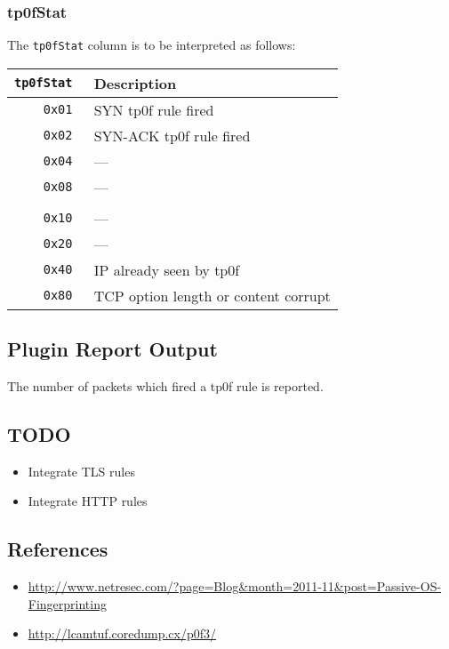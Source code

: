 \documentclass[documentation]{subfiles}
\begin{document}
\subsubsection{tp0fStat}\label{tp0fStat}
The {\tt tp0fStat} column is to be interpreted as follows:
\begin{longtable}{>{\tt}rl}
    \toprule
    {\bf tp0fStat} & {\bf Description}\\
    \midrule\endhead%
    0x01 & SYN tp0f rule fired\\
    0x02 & SYN-ACK tp0f rule fired\\
    0x04 & ---\\
    0x08 & ---\\
    \\
    0x10 & ---\\
    0x20 & ---\\
    0x40 & IP already seen by tp0f\\
    0x80 & TCP option length or content corrupt \\
    \bottomrule
\end{longtable}

\subsection{Plugin Report Output}
The number of packets which fired a tp0f rule is reported.



\subsection{TODO}
\begin{itemize}
    \item Integrate TLS rules
    \item Integrate HTTP rules
\end{itemize}

\subsection{References}
\begin{itemize}
    \item \url{http://www.netresec.com/?page=Blog&month=2011-11&post=Passive-OS-Fingerprinting}
    \item \url{http://lcamtuf.coredump.cx/p0f3/}
\end{itemize}
\end{document}
